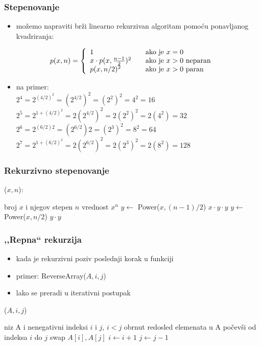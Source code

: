 \documentclass[compress]{beamer}
\begin{document}
\begin{frame}[fragile]
  \frametitle{Stepenovanje}
  \begin{itemize}
    \item možemo napraviti brži linearno rekurzivan algoritam pomoću ponavljanog kvadriranja:
  \end{itemize}
  $$ p(x,n) = \left\{ \begin{array}{l l} 1 & \quad \text{ako je $x=0$} \\x\cdot p(x, \frac{n-1}{2})^2 & \quad \text{ako je $x>0$ neparan}\\p(x,n/2)^2 & \quad
  \text{ako je $x>0$ paran} \end{array}\right. $$
  \begin{itemize}
    \item na primer: \\
    $ 2^4 =  2^{(4/2)}^2 = (2^{4/2})^2 = (2^2)^2 = 4^2 = 16 $ \\
    $ 2^5  =  2^{1+(4/2)}^2 = 2(2^{4/2})^2 = 2(2^2)^2 = 2(4^2) = 32 $ \\
    $ 2^6  = 2^{(6/2)2} = (2^{6/2})2 = (2^3)^2 = 8^2 = 64 $ \\
    $ 2^7  = 2^{1+(6/2)}^2 = 2(2^{6/2})^2 = 2(2^3)^2 = 2(8^2) = 128$
  \end{itemize}
\end{frame}

\begin{frame}[fragile]
  \frametitle{Rekurzivno stepenovanje}
($x, n$):
\begin{algorithmic}
\REQUIRE broj $x$ i njegov stepen $n$
\ENSURE vrednost $x^n$
\ENDIF
{}
  \STATE $y \leftarrow$ Power($x, (n-1)/2$) 
  \RETURN $x\cdot y\cdot y$
\ELSE
  \STATE $y \leftarrow$ Power($x, n/2$)
  \RETURN $y\cdot y$  
\ENDIF  
\end{algorithmic}
\end{frame}

\begin{frame}[fragile]
  \frametitle{,,Repna`` rekurzija}
  \begin{itemize}
    \item kada je rekurzivni poziv poslednji korak u funkciji
    \item primer: ReverseArray($A, i, j$)
    \item lako se preradi u iterativni postupak
  \end{itemize}
($A, i, j$)
\begin{algorithmic}
\REQUIRE niz A i nenegativni indeksi $i$ i $j$, $i<j$
\ENSURE obrnut redosled elemenata u A počevši od indeksa $i$ do $j$
  \STATE swap $A[i], A[j]$
  \STATE $i \leftarrow i + 1$
  \STATE $j \leftarrow j - 1$
\ENDWHILE
\end{algorithmic}
\end{frame}
\end{document}

